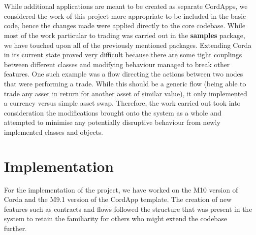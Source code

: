 \documentclass[12pt,twoside]{article}
\begin{document}
\\ \\
While additional applications are meant to be created as separate CordApps, we considered the work of this project more appropriate to be included in the basic code, hence the changes made were applied directly to the core codebase. While most of the work particular to trading was carried out in the \textbf{samples} package, we have touched upon all of the previously mentioned packages. Extending Corda in its current state proved very difficult because there are some tight couplings between different classes and modifying behaviour managed to break other features. One such example was a flow directing the actions between two nodes that were performing a trade. While this should be a generic flow (being able to trade any asset in return for another asset of similar value), it only implemented a currency versus simple asset swap. Therefore, the work carried out took into consideration the modifications brought onto the system as a whole and attempted to minimise any potentially disruptive behaviour from newly implemented classes and objects.
\newpage
\section{Implementation}
\label{sec:DesignImplementation}
For the implementation of the project, we have worked on the M10 version of Corda and the M9.1 version of the CordApp template. The creation of new features such as contracts and flows followed the structure that was present in the system to retain the familiarity for others who might extend the codebase further. 
\end{document}
